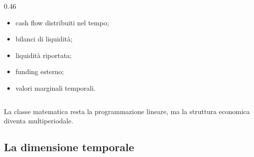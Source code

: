 \documentclass[handout]{beamer}%
\providecommand{\1}{\mathbf{1}}
\begin{document}
\begin{frame}
\begin{columns}[T]
\begin{column}{0.46\textwidth}
\begin{itemize}

\item cash flow distribuiti nel tempo;

\item bilanci di liquidit\`a;

\item liquidit\`a riportata;

\item funding esterno;

\item valori marginali temporali.

\end{itemize}

\end{column}

\end{columns}

\vspace{0.3cm}

La classe matematica resta la programmazione lineare, ma la struttura economica diventa multiperiodale.

\transboxout%
\end{frame}%

\subsection{La dimensione temporale}

\end{document}
